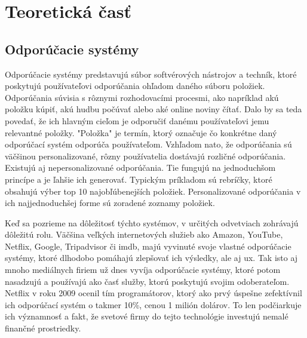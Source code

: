 \section{Teoretická časť}

\subsection{Odporúčacie systémy}
\label{sec:odporucacie systemy}
 Odporúčacie systémy predstavujú súbor softvérových nástrojov a techník, ktoré poskytujú používateľovi odporúčania ohľadom daného súboru položiek. Odporúčania súvisia s rôznymi rozhodovacími procesmi, ako napríklad akú položku kúpiť, akú hudbu počúvať alebo aké online noviny čítať. Dalo by sa teda povedať, že ich hlavným cieľom je odporučiť danému používateľovi jemu relevantné položky. "Položka" je termín, ktorý označuje čo konkrétne daný odporúčací systém odporúča používateľom. Vzhľadom nato, že odporúčania sú väčšinou personalizované, rôzny používatelia dostávajú rozličné odporúčania. Existujú aj nepersonalizované odporúčania. Tie fungujú na jednoduchšom princípe a je ľahšie ich generovať. Typickým príkladom sú rebríčky, ktoré obsahujú výber top 10 najobľúbenejších položiek. Personalizované odporúčania v ich najjednoduchšej forme sú zoradené zoznamy položiek. \cite{rs1} 
 
Keď sa pozrieme na dôležitosť týchto systémov, v určitých odvetviach zohrávajú dôležitú rolu. Väčšina veľkých internetových služieb ako Amazon, YouTube, Netflix, Google, Tripadvisor či \acrshort{imdb}, majú vyvinuté svoje vlastné odporúčacie systémy, ktoré dlhodobo pomáhajú zlepšovať ich výsledky, ale aj \acrshort{ux}. Tak isto aj mnoho mediálnych firiem už dnes vyvíja odporúčacie systémy, ktoré potom nasadzujú a používajú ako časť služby, ktorú poskytujú svojim odoberateľom. Netflix v roku 2009 ocenil tím programátorov, ktorý ako prvý úspešne zefektívnil ich odporúčací systém o takmer 10\%, cenou 1 milión dolárov. To len podčiarkuje ich významnosť a fakt, že svetové firmy do tejto technológie investujú nemalé finančné prostriedky. \cite{rs1} \\

